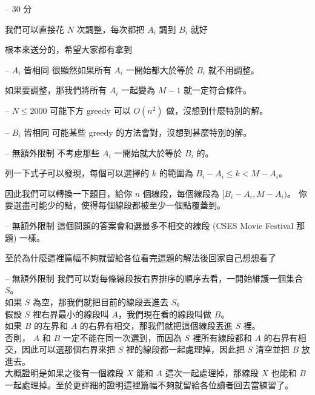 \documentclass[hyperref,UTF8,notheorems,xcolor={dvipsnames}]{beamer}
\newcommand{\btitle}[1]{{\secname} -- #1}
\theoremstyle{definition}
\begin{document}
\begin{frame}[fragile]{\btitle{30 分}}
	
	我們可以直接花 $N$ 次調整，每次都把 $A_i$ 調到 $B_i$ 就好
	\pause

	根本來送分的，希望大家都有拿到
	
\end{frame}

\begin{frame}[fragile]{\btitle{$A_i$ 皆相同}}
	很顯然如果所有 $A_i$ 一開始都大於等於 $B_i$ 就不用調整。
	\pause

	如果要調整，那我們將所有 $A_i$ 一起變為 $M - 1$ 就一定符合條件。
\end{frame}

\begin{frame}[fragile]{\btitle{$N \le 2000$}}
	可能下方 greedy 可以 $O(n^2)$ 做，沒想到什麼特別的解。

\end{frame}

\begin{frame}[fragile]{\btitle{$B_i$ 皆相同}}
	可能某些 greedy 的方法會對，沒想到甚麼特別的解。
	
\end{frame}

\begin{frame}[fragile]{\btitle{無額外限制}}
	不考慮那些 $A_i$ 一開始就大於等於 $B_i$ 的。

	列一下式子可以發現，每個可以選擇的 $k$ 的範圍為 $B_i - A_i \le k < M - A_i$。 
	\pause 

	因此我們可以轉換一下題目，給你 $n$ 個線段，每個線段為 $[B_i - A_i, M - A_i)$。
	你要選盡可能少的點，使得每個線段都被至少一個點覆蓋到。
\end{frame}

\begin{frame}[fragile]{\btitle{無額外限制}}
	這個問題的答案會和選最多不相交的線段 (CSES Movie Festival 那題) 一樣。

	至於為什麼這裡篇幅不夠就留給各位看完這題的解法後回家自己想想看了
\end{frame}

\begin{frame}[fragile]{\btitle{無額外限制}}
	我們可以對每條線段按右界排序的順序去看，一開始維護一個集合 $S$。  \\
	如果 $S$ 為空，那我們就把目前的線段丟進去 $S$。  \\ \pause
	假設 $S$ 裡右界最小的線段叫 $A$，我們現在看的線段叫做 $B$。  \\ 
	如果 $B$ 的左界和 $A$ 的右界有相交，那我們就把這個線段丟進 $S$ 裡。  \\ \pause
	否則， $A$ 和 $B$ 一定不能在同一次選到，而因為 $S$ 裡所有線段都和 $A$ 的右界有相交，因此可以選那個右界來把 $S$ 裡的線段都一起處理掉，因此把 $S$ 清空並把 $B$ 放進去。  \\ 
	大概證明是如果之後有一個線段 $X$ 能和 $A$ 這次一起處理掉，那線段 $X$ 也能和 $B$ 一起處理掉。至於更詳細的證明這裡篇幅不夠就留給各位讀者回去當練習了。
\end{frame}
\end{document}

